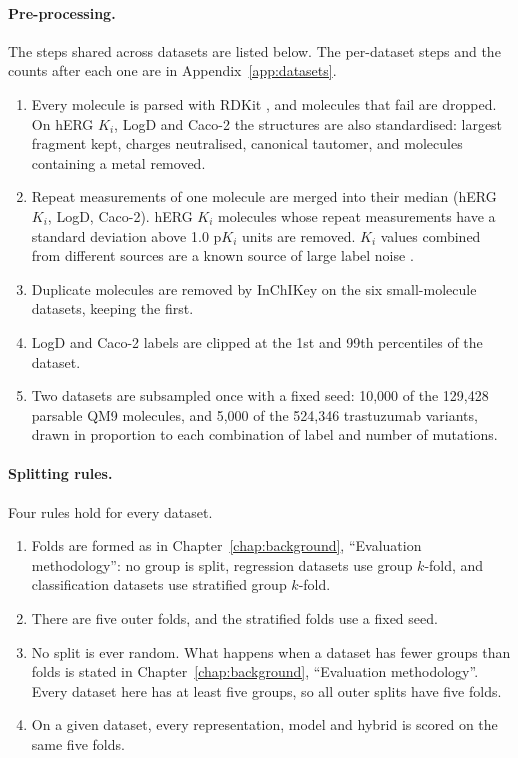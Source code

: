 \paragraph{Pre-processing.} The steps shared across datasets are listed below. The per-dataset steps and the counts after each one are in Appendix~\ref{app:datasets}.
\begin{enumerate}[leftmargin=*]
    \item Every molecule is parsed with RDKit \citep{rdkit}, and molecules that fail are dropped. On hERG $K_i$, LogD and Caco-2 the structures are also standardised: largest fragment kept, charges neutralised, canonical tautomer, and molecules containing a metal removed.
    \item Repeat measurements of one molecule are merged into their median (hERG $K_i$, LogD, Caco-2). hERG $K_i$ molecules whose repeat measurements have a standard deviation above 1.0 p$K_i$ units are removed. $K_i$ values combined from different sources are a known source of large label noise \citep{landrum2024}.
    \item Duplicate molecules are removed by InChIKey on the six small-molecule datasets, keeping the first.
    \item LogD and Caco-2 labels are clipped at the 1st and 99th percentiles of the dataset.
    \item Two datasets are subsampled once with a fixed seed: 10,000 of the 129,428 parsable QM9 molecules, and 5,000 of the 524,346 trastuzumab variants, drawn in proportion to each combination of label and number of mutations.
\end{enumerate}

\paragraph{Splitting rules.} Four rules hold for every dataset.
\begin{enumerate}[leftmargin=*]
    \item Folds are formed as in Chapter~\ref{chap:background}, ``Evaluation methodology'': no group is split, regression datasets use group $k$-fold, and classification datasets use stratified group $k$-fold.
    \item There are five outer folds, and the stratified folds use a fixed seed.
    \item No split is ever random. What happens when a dataset has fewer groups than folds is stated in Chapter~\ref{chap:background}, ``Evaluation methodology''. Every dataset here has at least five groups, so all outer splits have five folds.
    \item On a given dataset, every representation, model and hybrid is scored on the same five folds.
\end{enumerate}

